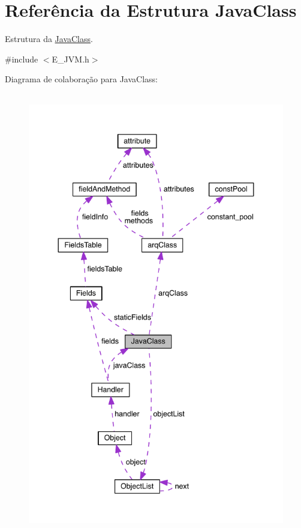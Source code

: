 \hypertarget{struct_java_class}{}\section{Referência da Estrutura Java\+Class}
\label{struct_java_class}


Estrutura da \hyperlink{struct_java_class}{Java\+Class}.  




{\ttfamily \#include $<$E\+\_\+\+J\+V\+M.\+h$>$}



Diagrama de colaboração para Java\+Class\+:
\nopagebreak
\begin{figure}[H]
\begin{center}
\leavevmode
\includegraphics[height=550pt]{struct_java_class__coll__graph}
\end{center}
\end{figure}
